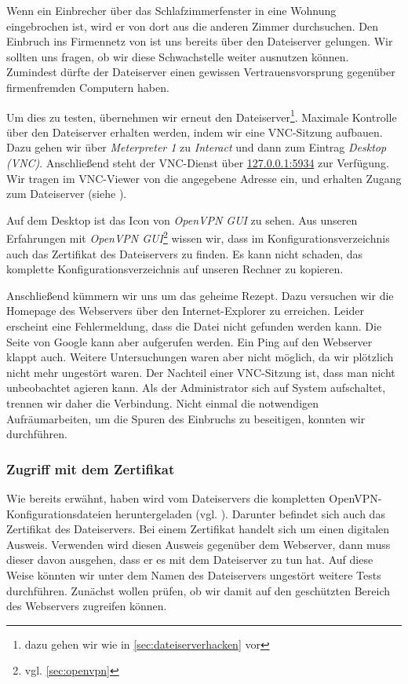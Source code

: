 Wenn ein Einbrecher über das Schlafzimmerfenster in eine Wohnung eingebrochen
ist, wird er von dort aus die anderen Zimmer durchsuchen. Den Einbruch ins
Firmennetz von \Mayerbrot{} ist uns bereits über den Dateiserver gelungen. Wir
sollten uns fragen, ob wir diese Schwachstelle weiter ausnutzen
können. Zumindest dürfte der Dateiserver einen gewissen Vertrauensvorsprung
gegenüber firmenfremden Computern haben.

Um dies zu testen, übernehmen wir erneut den Dateiserver\footnote{dazu gehen wir
  wie in \cref{sec:dateiserverhacken} vor}. Maximale Kontrolle über den
Dateiserver erhalten werden, indem wir eine VNC-Sitzung aufbauen. Dazu gehen wir
über \emph{Meterpreter 1} zu \emph{Interact} und dann zum Eintrag \emph{Desktop
  (VNC)}. Anschließend steht der VNC-Dienst über \url{127.0.0.1:5934} zur
Verfügung. Wir tragen im VNC-Viewer von \Metasploit{} die angegebene Adresse
ein, und erhalten Zugang zum Dateiserver (siehe ).


Auf dem Desktop ist das Icon von \emph{OpenVPN GUI} zu sehen. Aus unseren
Erfahrungen mit \emph{OpenVPN GUI}\footnote{vgl. \cref{sec:openvpn}} wissen wir,
dass im Konfigurationsverzeichnis auch das Zertifikat des Dateiservers zu
finden. Es kann nicht schaden, das komplette Konfigurationsverzeichnis auf
unseren Rechner zu kopieren.

Anschließend kümmern wir uns um das geheime Rezept. Dazu versuchen wir die
Homepage des Webservers über den Internet-Explorer zu erreichen. Leider
erscheint eine Fehlermeldung, dass die Datei nicht gefunden werden kann. Die
Seite von Google kann aber aufgerufen werden. Ein Ping auf den Webserver klappt
auch. Weitere Untersuchungen waren aber nicht möglich, da wir plötzlich nicht
mehr ungestört waren. Der Nachteil einer VNC-Sitzung ist, dass man nicht
unbeobachtet agieren kann. Als der Administrator sich auf System aufschaltet,
trennen wir daher die Verbindung. Nicht einmal die notwendigen Aufräumarbeiten,
um die Spuren des Einbruchs zu beseitigen, konnten wir durchführen.

\subsubsection{Zugriff mit dem Zertifikat}

Wie bereits erwähnt, haben wird vom Dateiservers die kompletten
OpenVPN-Konfigurationsdateien heruntergeladen
(vgl. ). Darunter befindet sich auch das Zertifikat
des Dateiservers. Bei einem Zertifikat handelt sich um einen digitalen
Ausweis. Verwenden wird diesen Ausweis gegenüber dem Webserver, dann muss dieser
davon ausgehen, dass er es mit dem Dateiserver zu tun hat. Auf diese Weise
könnten wir unter dem Namen des Dateiservers ungestört weitere Tests
durchführen. Zunächst wollen prüfen, ob wir damit auf den geschützten Bereich
des Webservers zugreifen können.

